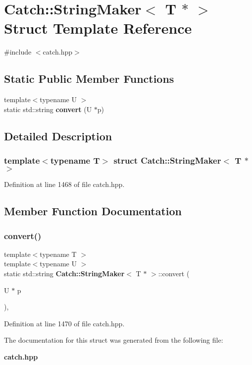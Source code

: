 \section{Catch\+::String\+Maker$<$ T $\ast$ $>$ Struct Template Reference}
\label{struct_catch_1_1_string_maker_3_01_t_01_5_01_4}


{\ttfamily \#include $<$catch.\+hpp$>$}

\subsection*{Static Public Member Functions}
\begin{DoxyCompactItemize}
\item 
{\footnotesize template$<$typename U $>$ }\\static std\+::string \textbf{ convert} (U $\ast$p)
\end{DoxyCompactItemize}


\subsection{Detailed Description}
\subsubsection*{template$<$typename T$>$\newline
struct Catch\+::\+String\+Maker$<$ T $\ast$ $>$}



Definition at line 1468 of file catch.\+hpp.



\subsection{Member Function Documentation}
\mbox{\label{struct_catch_1_1_string_maker_3_01_t_01_5_01_4_a2adbc75c99d71b8323f4052bcb0815c9}} 
\subsubsection{convert()}
{\footnotesize\ttfamily template$<$typename T $>$ \\
template$<$typename U $>$ \\
static std\+::string \textbf{ Catch\+::\+String\+Maker}$<$ T $\ast$ $>$\+::convert (\begin{DoxyParamCaption}\item[{U $\ast$}]{p }\end{DoxyParamCaption})\hspace{0.3cm}{\ttfamily [inline]}, {\ttfamily [static]}}



Definition at line 1470 of file catch.\+hpp.



The documentation for this struct was generated from the following file\+:\begin{DoxyCompactItemize}
\item 
\textbf{ catch.\+hpp}\end{DoxyCompactItemize}
